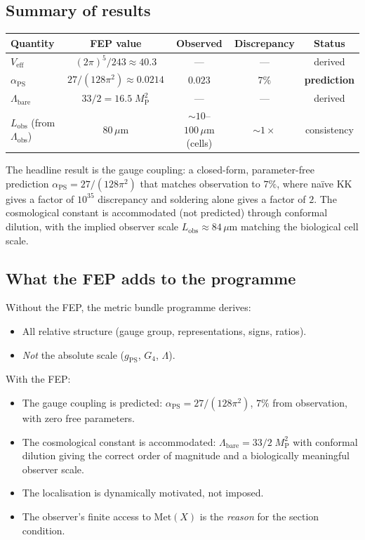\documentclass[12pt, a4paper]{article}
\theoremstyle{definition}
\theoremstyle{remark}
\newcommand{\Met}{\mathrm{Met}}
\newcommand{\Veff}{V_{\mathrm{eff}}}
\newcommand{\MP}{M_{\mathrm{P}}}
\newcommand{\gPS}{g_{\mathrm{PS}}}
\newcommand{\aPS}{\alpha_{\mathrm{PS}}}
\newcommand{\Lobs}{L_{\mathrm{obs}}}
\begin{document}
\subsection{Summary of results}

\begin{center}
\renewcommand{\arraystretch}{1.3}
\small
\begin{tabular}{lcccc}
\toprule
\textbf{Quantity} & \textbf{FEP value} & \textbf{Observed} & \textbf{Discrepancy} & \textbf{Status} \\
\midrule
$\Veff$ & $(2\pi)^5/243 \approx 40.3$ & --- & --- & derived \\
$\aPS$ & $27/(128\pi^2) \approx 0.0214$ & $0.023$ & $7\%$ & \textbf{prediction} \\
$\Lambda_{\mathrm{bare}}$ & $33/2 = 16.5\;\MP^2$ & --- & --- & derived \\
$\Lobs$ (from $\Lambda_{\mathrm{obs}}$) & $80\,\mu\mathrm{m}$ & $\sim 10$--$100\,\mu\mathrm{m}$ (cells) & $\sim 1\times$ & consistency \\
\bottomrule
\end{tabular}
\end{center}

The headline result is the gauge coupling: a closed-form, parameter-free prediction $\aPS = 27/(128\pi^2)$ that matches observation to $7\%$, where na\"ive KK gives a factor of $10^{35}$ discrepancy and soldering alone gives a factor of $2$.
The cosmological constant is accommodated (not predicted) through conformal dilution, with the implied observer scale $\Lobs \approx 84\,\mu\mathrm{m}$ matching the biological cell scale.

\subsection{What the FEP adds to the programme}

Without the FEP, the metric bundle programme derives:
\begin{itemize}[nosep]
\item All relative structure (gauge group, representations, signs, ratios).
\item \emph{Not} the absolute scale ($\gPS$, $G_4$, $\Lambda$).
\end{itemize}
With the FEP:
\begin{itemize}[nosep]
\item The gauge coupling is predicted: $\aPS = 27/(128\pi^2)$, $7\%$ from observation, with zero free parameters.
\item The cosmological constant is accommodated: $\Lambda_{\mathrm{bare}} = 33/2\;\MP^2$ with conformal dilution giving the correct order of magnitude and a biologically meaningful observer scale.
\item The localisation is dynamically motivated, not imposed.
\item The observer's finite access to $\Met(X)$ is the \emph{reason} for the section condition.
\end{itemize}
\end{document}
